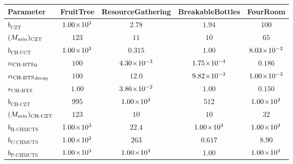     \begin{table}[tbp]
        \centering
        {%
        \setlength{\tabcolsep}{4pt}%
        \fontsize{12}{14.5}\selectfont
        \begin{tabular}{l|c|c|c|c}
            Parameter
                & FruitTree
                & ResourceGathering
                & BreakableBottles
                & FourRoom  \\
            \hline
            $b_{\text{CZT}}$                                & $1.00\!\times\!10^{3}$ & $2.78$ & $1.94$ & $100$ \\
            $(M_{\textnormal{min}})_{\text{CZT}}$                          & $123$ & $11$ & $10$ & $65$ \\

            $b_{\text{CH-UCT}}$                             & $1.00\!\times\!10^{3}$ & $0.315$ & $1.00$ & $8.03\!\times\!10^{-2}$ \\

            ${\alpha_{{\textnormal{CH-BTS}}}}_{0}$                               & $100$ & $4.30\!\times\!10^{-3}$ & $1.75\!\times\!10^{-4}$ & $0.186$ \\
            ${\alpha_{{\textnormal{CH-BTS}}}}_{\text{decay}}$                    & $100$ & $12.0$ & $9.82\!\times\!10^{-3}$ & $1.00\!\times\!10^{-3}$ \\
            ${\epsilon_{{\textnormal{CH-BTS}}}}$                                     & $1.00$ & $3.86\!\times\!10^{-2}$ & $1.00$ & $0.150$ \\

            $b_{\text{CH-CZT}}$                             & $995$ & $1.00\!\times\!10^{3}$ & $512$ & $1.00\!\times\!10^{3}$ \\
            $(M_{\textnormal{min}})_{\text{CH-CZT}}$                       & $123$ & $10$ & $10$ & $32$ \\

            $b_{\text{H-CHMCTS}}$                           & $1.00\!\times\!10^{3}$ & $22.4$ & $1.00\!\times\!10^{3}$ & $1.00\!\times\!10^{3}$ \\
            $b_{\text{C-CHMCTS}}$                           & $1.00\!\times\!10^{3}$ & $263$ & $0.617$ & $8.90$ \\
            $b_{\text{P-CHMCTS}}$                           & $1.00\!\times\!10^{3}$ & $1.00\!\times\!10^{3}$ & $1.00$ & $1.00\!\times\!10^{3}$ \\


\end{tabular}}
\end{table}
